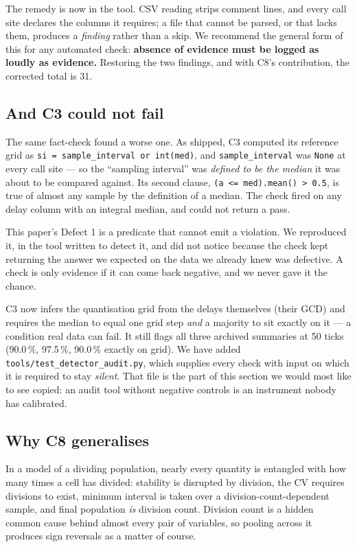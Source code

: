 \documentclass[11pt,letterpaper]{article}
\begin{document}
The remedy is now in the tool. CSV reading strips comment lines, and
every call site declares the columns it requires; a file that cannot be
parsed, or that lacks them, produces a \emph{finding} rather than a
skip. We recommend the general form of this for any automated check:
\textbf{absence of evidence must be logged as loudly as evidence.}
Restoring the two findings, and with C8's contribution, the corrected
total is 31.

\subsection{And C3 could not fail}

The same fact-check found a worse one. As shipped, C3 computed its
reference grid as \texttt{si = sample\_interval or int(med)}, and
\texttt{sample\_interval} was \texttt{None} at every call site --- so
the ``sampling interval'' was \emph{defined to be the median} it was
about to be compared against. Its second clause,
\texttt{(a <= med).mean() > 0.5}, is true of almost any sample by the
definition of a median. The check fired on any delay column with an
integral median, and could not return a pass.

This paper's Defect 1 is a predicate that cannot emit a violation. We
reproduced it, in the tool written to detect it, and did not notice
because the check kept returning the answer we expected on the data we
already knew was defective. A check is only evidence if it can come back
negative, and we never gave it the chance.

C3 now infers the quantisation grid from the delays themselves (their
GCD) and requires the median to equal one grid step \emph{and} a
majority to sit exactly on it --- a condition real data can fail. It
still flags all three archived summaries at 50 ticks (90.0\,\%,
97.5\,\%, 90.0\,\% exactly on grid). We have added
\texttt{tools/test\_detector\_audit.py}, which supplies every check
with input on which it is required to stay \emph{silent}. That file is
the part of this section we would most like to see copied: an audit tool
without negative controls is an instrument nobody has calibrated.

\subsection{Why C8 generalises}

In a model of a dividing population, nearly every quantity is entangled
with how many times a cell has divided: stability is disrupted by
division, the CV requires divisions to exist, minimum interval is taken
over a division-count-dependent sample, and final population
\emph{is} division count. Division count is a hidden common cause behind
almost every pair of variables, so pooling across it produces sign
reversals as a matter of course.
\end{document}

